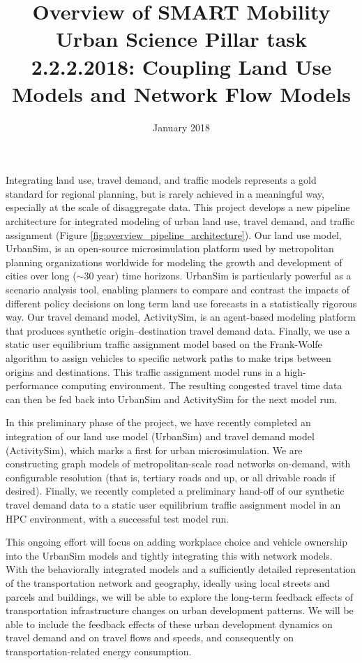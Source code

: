 \documentclass[12pt]{article}
\title{Overview of SMART Mobility Urban Science Pillar task 2.2.2.2018: Coupling Land Use Models and Network Flow Models}
\date{January 2018}
\begin{document}
	
\maketitle

Integrating land use, travel demand, and traffic models represents a gold standard for regional planning, but is rarely achieved in a meaningful way, especially at the scale of disaggregate data. This project develops a new pipeline architecture for integrated modeling of urban land use, travel demand, and traffic assignment (Figure \ref{fig:overview_pipeline_architecture}). Our land use model, UrbanSim, is an open-source microsimulation platform used by metropolitan planning organizations worldwide for modeling the growth and development of cities over long ($\sim$30 year) time horizons. UrbanSim is particularly powerful as a scenario analysis tool, enabling planners to compare and contrast the impacts of different policy decisions on long term land use forecasts in a statistically rigorous way. Our travel demand model, ActivitySim, is an agent-based modeling platform that produces synthetic origin--destination travel demand data. Finally, we use a static user equilibrium traffic assignment model based on the Frank-Wolfe algorithm to assign vehicles to specific network paths to make trips between origins and destinations. This traffic assignment model runs in a high-performance computing environment. The resulting congested travel time data can then be fed back into UrbanSim and ActivitySim for the next model run.

In this preliminary phase of the project, we have recently completed an integration of our land use model (UrbanSim) and travel demand model (ActivitySim), which marks a first for urban microsimulation. We are constructing graph models of metropolitan-scale road networks on-demand, with configurable resolution (that is, tertiary roads and up, or all drivable roads if desired). Finally, we recently completed a preliminary hand-off of our synthetic travel demand data to a static user equilibrium traffic assignment model in an HPC environment, with a successful test model run.

This ongoing effort will focus on adding workplace choice and vehicle ownership into the UrbanSim models and tightly integrating this with network models. With the behaviorally integrated models and a sufficiently detailed representation of the transportation network and geography, ideally using local streets and parcels and buildings, we will be able to explore the long-term feedback effects of transportation infrastructure changes on urban development patterns. We will be able to include the feedback effects of these urban development dynamics on travel demand and on travel flows and speeds, and consequently on transportation-related energy consumption.
\end{document}
